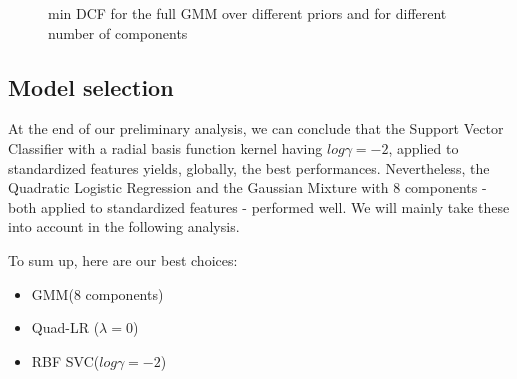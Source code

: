 \begin{figure}[H]
	\caption{min DCF for the full GMM over different priors and for different number of components}
	\label{fig:gmm_pi}
\end{figure}

\subsection{Model selection}
At the end of our preliminary analysis, we can conclude that the Support Vector Classifier with a radial basis function kernel having $log\gamma = -2$, applied to standardized features yields, globally, the best performances. 
Nevertheless, the Quadratic Logistic Regression and the Gaussian Mixture with 8 components - both applied to standardized features - performed well. We will mainly take these into account in the following analysis. 

To sum up, here are our best choices:
\begin{itemize}
	\item GMM(8 components)
	\item Quad-LR ($\lambda=0$)
	\item RBF SVC($log \gamma=-2$)
\end{itemize}
